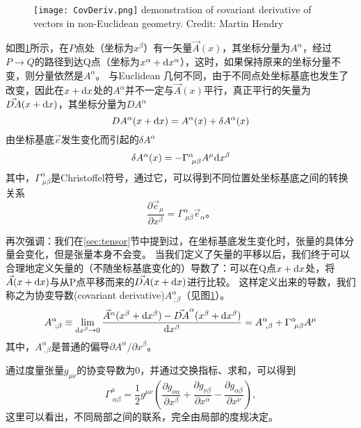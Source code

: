\begin{figure}[htp]
\centering
\texttt{[image: CovDeriv.png]}
  {demonstration of covariant derivative of vectors in non-Euclidean geometry. Credit: Martin Hendry}
\label{fig:CovDeriv}
\end{figure}

如图\ref{fig:CovDeriv}所示，在$P$点处（坐标为$x^\beta$）有一矢量$\vec{A}(x)$，其坐标分量为$A^\alpha$，经过$P \to Q$的路径到达Q点（坐标为$x^\alpha+{\rm d}x^\alpha$），这时，如果保持原来的坐标分量不变，则分量依然是$A^\alpha$。
与Euclidean 几何不同，由于不同点处坐标基底也发生了改变，因此在$x+{\rm d}x$处的$A^\alpha$并不一定与$\vec{A}(x)$平行，真正平行的矢量为$\vec{DA}(x+{\rm d}x)$，其坐标分量为$DA^\alpha$
\begin{equation}\label{eq:parallel}
  DA^\alpha(x+{\rm d}x) = A^\alpha(x) + \delta A^\alpha(x)
\end{equation}
由坐标基底$\vec{e}$发生变化而引起的$\delta A^\alpha$
\begin{equation}\label{eq:deltaA}
  \delta A^\alpha(x) = -\Gamma^\alpha_{~\mu\beta} A^\mu {\rm d}x^\beta
\end{equation}
其中，$\Gamma^\alpha_{~\mu\beta}$是Christoffel符号，通过它，可以得到不同位置处坐标基底之间的转换关系
\begin{equation}\label{eq:Christoffel}
\frac{\partial \vec{e}_\mu}{\partial x^\beta} = \Gamma^\alpha_{~\mu\beta} \vec{e}_\alpha。
\end{equation}

再次强调：我们在\ref{sec:tensor}节中提到过，在坐标基底发生变化时，张量的具体分量会变化，但是张量本身不会变。
当我们定义了矢量的平移以后，我们终于可以合理地定义矢量的（不随坐标基底变化的）导数了：可以在Q点$x+{\rm d}x$处，将$\vec{A}(x+{\rm d}x)$与从P点平移而来的$\vec{DA}(x+{\rm d}x)$进行比较。
这样定义出来的导数，我们称之为协变导数(covariant derivative)$A^\alpha_{~; \beta}$（见图\ref{fig:CovDeriv}）。
\begin{equation}\label{eq:CovDeriv}
A^\alpha_{~; \beta} \equiv \lim_{{\rm d}x^\beta \to 0}\frac{\vec{A}^\alpha(x^\beta+{\rm d}x^\beta)-\vec{DA}^\alpha(x^\beta+{\rm d}x^\beta)}{{\rm d}x^\beta} =A^\alpha_{~, \beta} + \Gamma^\alpha_{~\mu\beta}A^\mu
\end{equation}
其中，$A^\alpha_{~, \beta}$是普通的偏导$\partial A^\alpha/\partial x^\beta$。

通过度量张量$g_{\mu\nu}$的协变导数为0，并通过交换指标、求和，可以得到
\begin{equation}\label{eq:ChristoffelDef}
\Gamma ^{\mu}_{{~\alpha\beta}}={\frac  {1}{2}}g^{{\mu\nu}}\left({\frac  {\partial g_{{\nu\alpha}}}{\partial x^{\beta}}}+{\frac  {\partial g_{{\nu\beta}}}{\partial x^{\alpha}}}-{\frac  {\partial g_{{\alpha\beta}}}{\partial x^{\nu}}}\right),
\end{equation}
这里可以看出，不同局部之间的联系，完全由局部的度规决定。

